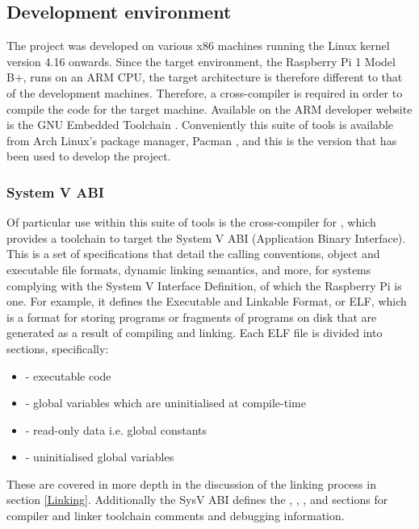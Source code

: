 \subsection{Development environment}
    The project was developed on various x86 machines running the Linux kernel
    version 4.16 onwards. Since the target environment, the Raspberry Pi 1 Model
    B+, runs on an ARM CPU, the target architecture is therefore different to
    that of the development machines. Therefore, a cross-compiler is required in
    order to compile the code for the target machine. Available on the ARM
    developer website is the GNU Embedded Toolchain \cite{GNUToolchain}.
    Conveniently this suite of tools is available from Arch Linux's package
    manager, Pacman \cite{Pacman}, and this is the version that has been used to
    develop the project.

    \subsubsection{System V ABI}
        Of particular use within this suite of tools is the cross-compiler for
        , which provides a toolchain to target the System V
        ABI (Application Binary Interface). This is a set of specifications that
        detail the calling conventions, object and executable file formats,
        dynamic linking semantics, and more, for systems complying with the
        System V Interface Definition, of which the Raspberry Pi is one. For
        example, it defines the Executable and Linkable Format, or ELF, which is
        a format for storing programs or fragments of programs on disk that are
        generated as a result of compiling and linking. Each ELF file is divided
        into sections, specifically:
        \begin{itemize}
            \itemsep0em
            \item {} - executable code
            \item {} - global variables which are uninitialised at
                compile-time
            \item {} - read-only data i.e. global constants
            \item {} - uninitialised global variables
        \end{itemize}

        These are covered in more depth in the discussion of the linking process
        in section \ref{Linking}. Additionally the SysV ABI defines the
        , , , and 
        sections for compiler and linker toolchain comments and debugging
        information.

